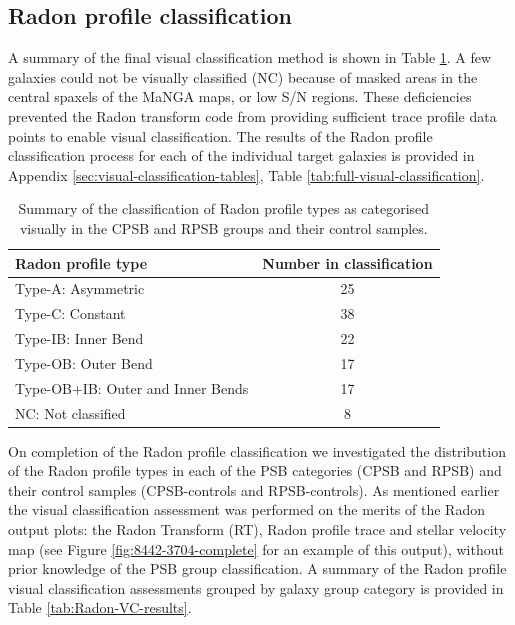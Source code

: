 \subsection{Radon profile classification}
\label{sec:Radon-profile-classification}

A summary of the final visual classification method is shown in Table \ref{tab:Radon-class-summary}.  A few galaxies could not be visually classified (NC) because of masked areas in the central spaxels of the MaNGA maps, or low S/N regions. These deficiencies prevented the Radon transform code from providing sufficient trace profile data points to enable visual classification. The results of the Radon profile classification process for each of the individual target galaxies is provided in Appendix \ref{sec:visual-classification-tables}, Table \ref{tab:full-visual-classification}. 

\begin{table}
    \centering
    \caption[Summary of Radon profile type visual classifications]{Summary of the classification of Radon profile types as categorised visually in the CPSB and RPSB groups and their control samples.}
    \label{tab:Radon-class-summary}
    \begin{tabular}{lc}
    \hline
    Radon profile type & Number in classification \\
    \hline
    Type-A: Asymmetric & 25 \\
    Type-C: Constant & 38 \\
    Type-IB: Inner Bend & 22 \\
    Type-OB: Outer Bend & 17 \\
    Type-OB+IB: Outer and Inner Bends & 17 \\
    NC: Not classified & 8 \\
    \hline
    \end{tabular}
\end{table}

On completion of the Radon profile classification we investigated the distribution of the Radon profile types in each of the PSB categories (CPSB and RPSB) and their control samples (CPSB-controls and RPSB-controls). As mentioned earlier the visual classification assessment was performed on the merits of the Radon output plots: the Radon Transform (RT), Radon profile trace and stellar velocity map (see Figure \ref{fig:8442-3704-complete} for an example of this output), without prior knowledge of the PSB group classification. A summary of the Radon profile visual classification assessments grouped by galaxy group category is provided in Table \ref{tab:Radon-VC-results}.

